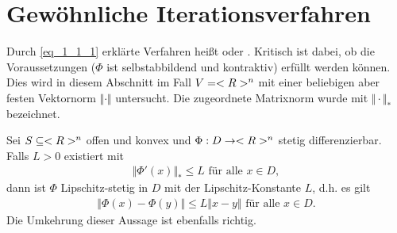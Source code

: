 \section{Gewöhnliche Iterationsverfahren}

Durch \cref{eq_1_1_1} erklärte Verfahren heißt  oder . Kritisch ist dabei, ob die Voraussetzungen ($\Phi$ ist selbstabbildend und kontraktiv) erfüllt werden können. Dies wird in diesem Abschnitt im Fall $V = <R>^n$ mit einer beliebigen aber festen Vektornorm $\Vert \cdot \Vert$ untersucht. Die zugeordnete Matrixnorm wurde mit $\Vert \cdot \Vert_{\ast}$ bezeichnet.

\begin{lemma}
	Sei $S \subseteq <R>^n$ offen und konvex und $\Phi: D \to <R>^n$ stetig differenzierbar. Falls $L > 0$ existiert mit
	\begin{align}
	\Vert \Phi'(x) \Vert_{\ast} \le L \text{ für alle } x \in D, \label{eq_1_1_5}
	\end{align}
	dann ist $\Phi$ Lipschitz-stetig in $D$ mit der Lipschitz-Konstante $L$, d.h. es gilt
	\begin{align}
	\Vert \Phi(x) - \Phi(y)\Vert \le L \Vert x-y \Vert \text{ für alle } x \in D. \label{eq_1_1_6}
	\end{align}
	Die Umkehrung dieser Aussage ist ebenfalls richtig.
\end{lemma}

